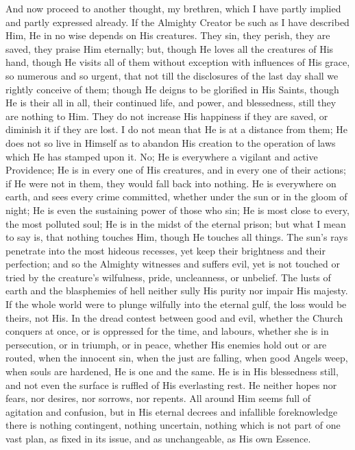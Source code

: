 And now proceed to another thought, my brethren, which I have
partly implied and partly expressed already. If the Almighty Creator
be such as I have described Him, He in no wise depends on His
creatures. They sin, they perish, they are saved, they praise Him
eternally; but, though He loves all the creatures of His hand, though
He visits all of them without exception with influences of His grace,
so numerous and so urgent, that not till the disclosures of the last
day shall we rightly conceive of them; though He deigns to be
glorified in His Saints, though He is their all in all, their
continued life, and power, and blessedness, still they are nothing to
Him. They do not increase His happiness if they are saved, or diminish
it if they are lost. I do not mean that He is at a distance from them;
He does not so live in Himself as to abandon His creation to the
operation of laws which He has stamped upon it. No; He is everywhere a
vigilant and active Providence; He is in every one of His creatures,
and in every one of their actions; if He were not in them, they would
fall back into nothing. He is everywhere on earth, and sees every
crime committed, whether under the sun or in the gloom of night; He is
even the sustaining power of those who sin; He is most close to every,
the most polluted soul; He is in the midst of the eternal prison; but
what I mean to say is, that nothing touches Him, though He touches all
things. The sun's rays penetrate into the most hideous recesses, yet
keep their brightness and their perfection; and so the Almighty
witnesses and suffers evil, yet is not touched or tried by the
creature's wilfulness, pride, uncleanness, or unbelief. The lusts of
earth and the blasphemies of hell neither sully His purity nor impair
His majesty. If the whole world were to plunge wilfully into the
eternal gulf, the loss would be theirs, not His. In the dread contest
between good and evil, whether the Church conquers at once, or is
oppressed for the time, and labours, whether she is in persecution, or
in triumph, or in peace, whether His enemies hold out or are routed,
when the innocent sin, when the just are falling, when good Angels
weep, when souls are hardened, He is one and the same. He is in His
blessedness still, and not even the surface is ruffled of His
everlasting rest. He neither hopes nor fears, nor desires, nor
sorrows, nor repents. All around Him seems full of agitation and
confusion, but in His eternal decrees and infallible foreknowledge
there is nothing contingent, nothing uncertain, nothing which is not
part of one vast plan, as fixed in its issue, and as unchangeable, as
His own Essence.

